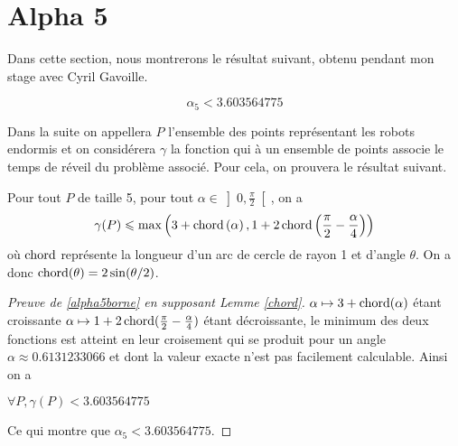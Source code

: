 \section{Alpha 5}

Dans cette section, nous montrerons le résultat suivant, obtenu pendant mon stage avec Cyril Gavoille.

\begin{theorem}\label{alpha5borne}

$$\alpha_5 < 3.603564775$$

\end{theorem}

Dans la suite on appellera $P$ l'ensemble des points représentant les robots endormis et on considérera $\gamma$ la fonction qui à un ensemble de points associe le temps de réveil du problème associé. Pour cela, on prouvera le résultat suivant.

\begin{lemma}\label{chord}
Pour tout $P$ de taille 5, pour tout $\alpha \in \left]0, \frac{\pi}{2}\right[$, on a
$$\gamma(P) \leqslant \max\left(3 + \operatorname{chord}\left(\alpha\right), 1 + 2\operatorname{chord}\left(\frac{\pi}{2} - \frac{\alpha}{4}\right)\right)$$
où $\operatorname{chord}$ représente la longueur d'un arc de cercle de rayon 1 et d'angle $\theta$. On a donc $\operatorname{chord}(\theta) = 2\sin(\theta/2)$.
\end{lemma}

\begin{proof}[Preuve de \ref{alpha5borne} en supposant Lemme \ref{chord}]

$\alpha \mapsto 3+\operatorname{chord}(\alpha)$ étant croissante $\alpha \mapsto 1 +
2\operatorname{chord}(\frac{\pi}{2} - \frac{\alpha}{4})$ étant décroissante, le minimum des
deux fonctions est atteint en leur croisement qui se produit pour un angle
$\alpha \approx 0.6131233066$ et dont la valeur exacte n'est pas facilement calculable. Ainsi on a

\(\forall P, \gamma(P) < 3.603564775\)

Ce qui montre que $\alpha_5 < 3.603564775$.

\end{proof}

